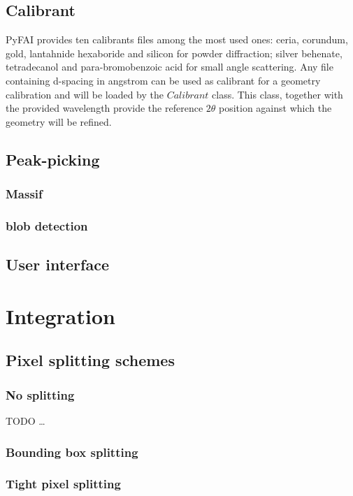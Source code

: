 \documentclass[preprint]{iucr}
\begin{document}
\subsection{Calibrant}
PyFAI provides ten calibrants files among the most used ones: ceria, corundum,
gold, lantahnide hexaboride and silicon for powder diffraction; silver behenate,
tetradecanol and para-bromobenzoic acid for small angle scattering.
Any file containing d-spacing in angstrom can be used as calibrant for a
geometry calibration and will be loaded by the $Calibrant$ class.
This class,
together with the provided wavelength provide the reference $2\theta$ position
against which the geometry will be refined.

\subsection{Peak-picking}

\subsubsection{Massif}
\subsubsection{blob detection}
\subsection{User interface}

\section{Integration}
\subsection{Pixel splitting schemes}
\subsubsection{No splitting}

TODO \ldots \cite{bilinge2014}

\subsubsection{Bounding box splitting}
\subsubsection{Tight pixel splitting}
\end{document}
